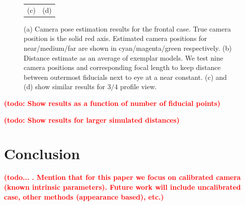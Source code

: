 \documentclass[runningheads]{llncs}
\newcommand {\afbnote} [1] {{\bf \textcolor{red}{(#1)}}}
\begin{document}
\begin{figure}[ht]
\begin{tabular}{cc}
(c) & (d)
\end{tabular}
\caption{(a) Camera pose estimation results for the frontal case.  True camera position is the solid red axis.  Estimated camera positions for near/medium/far are shown in cyan/magenta/green respectively.   (b) Distance estimate as an average of exemplar models.  We test nine camera positions and corresponding focal length to keep distance between outermost fiducials next to eye at a near constant. (c) and (d) show similar results for $3/4$ profile view.}
\label{fig:results}
\end{figure}

\afbnote{todo: Show results as a function of number of fiducial points}

\afbnote{todo: Show results for larger simulated distances}

\section{Conclusion}
\afbnote{todo... .  Mention that for this paper we focus on calibrated camera (known intrinsic parameters).  Future work will include uncalibrated case, other methods (appearance based), etc.}



\end{document}
